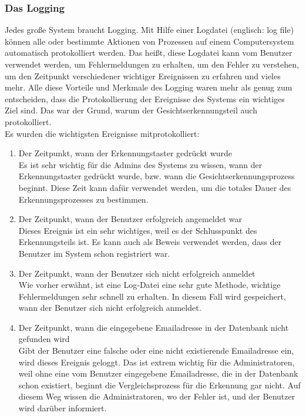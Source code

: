 \subsubsection{Das Logging}
Jedes große System braucht Logging. Mit Hilfe einer Logdatei (englisch: log file) können alle oder bestimmte Aktionen von Prozessen auf einem Computersystem automatisch protokolliert werden. Das heißt, diese Logdatei kann vom Benutzer verwendet werden, um Fehlermeldungen zu erhalten, um den Fehler zu verstehen, um den Zeitpunkt verschiedener wichtiger Ereignissen zu erfahren und vieles mehr. Alle diese Vorteile und Merkmale des Logging waren mehr als genug zum entscheiden, dass die Protokollierung der Ereignisse des Systems ein wichtiges Ziel sind. Das war der Grund, warum der Gesichtserkennungsteil auch protokolliert.\\
Es wurden die wichtigsten Ereignisse mitprotokolliert:
\begin{enumerate}
	\item Der Zeitpunkt, wann der Erkennungstaster gedrückt wurde \\
	
	Es ist sehr wichtig für die Admins des Systems zu wissen, wann der Erkennungstaster gedrückt wurde, bzw. wann die Gesichtserkennungsprozess beginnt. Diese Zeit kann dafür verwendet werden, um die totales Dauer des Erkennungsprozesses zu bestimmen.
	
	\item Der Zeitpunkt, wann der Benutzer erfolgreich angemeldet war \\
	
	Dieses Ereignis ist ein sehr wichtiges, weil es der Schlusspunkt des Erkennungsteils ist. Es kann auch als Beweis verwendet werden, dass der Benutzer im System schon registriert war.
	
	\item Der Zeitpunkt, wann der Benutzer sich nicht erfolgreich anmeldet \\
	
	Wie vorher erwähnt, ist eine Log-Datei eine sehr gute Methode, wichtige Fehlermeldungen sehr schnell zu erhalten. In diesem Fall wird gespeichert, wann der Benutzer sich nicht erfolgreich anmeldet.
	
	\item Der Zeitpunkt, wann die eingegebene Emailadresse in der Datenbank nicht gefunden wird \\
	
	Gibt der Benutzer eine falsche oder eine nicht existierende Emailadresse ein, wird dieses Ereignis geloggt. Das ist extrem wichtig für die Administratoren, weil ohne eine vom Benutzer eingegebene Emailadresse, die in der Datenbank schon existiert, beginnt die Vergleichsprozess für die Erkennung gar nicht. Auf diesem Weg wissen die Administratoren, wo der Fehler ist, und der Benutzer wird darüber informiert.
\end{enumerate}
